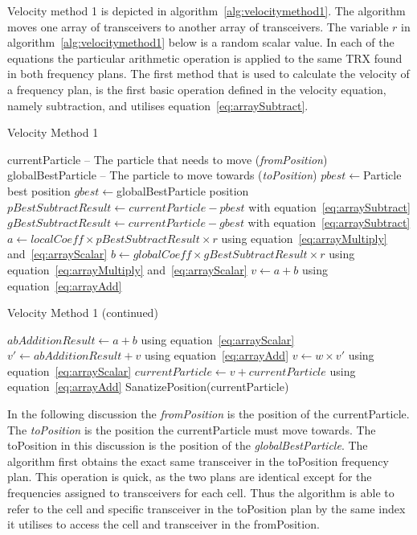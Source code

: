 Velocity method 1 is depicted in algorithm~\ref{alg:velocitymethod1}. The algorithm moves one array of transceivers to another array of transceivers. The variable $r$ in algorithm~\ref{alg:velocitymethod1} below is a random scalar value. In each of the equations the particular arithmetic operation is applied to the same TRX found in both frequency plans. The first method that is used to calculate the velocity of a frequency plan, is the first basic operation defined in the velocity equation, namely subtraction, and utilises equation~\ref{eq:arraySubtract}.
\begin{algorithm}[H]
\caption{Velocity Method 1}
\label{alg:velocitymethod1}
	\begin{algorithmic}[1]
        \Require currentParticle -- The particle that needs to move (\emph{fromPosition})
        \Require globalBestParticle -- The particle to move towards (\emph{toPosition})
	\State $pbest \leftarrow $Particle best position
	\State $gbest \leftarrow $globalBestParticle position
	\State $pBestSubtractResult \leftarrow currentParticle - pbest$ with equation~\ref{eq:arraySubtract}
	\State $gBestSubtractResult \leftarrow currentParticle - gbest$  with equation~\ref{eq:arraySubtract}
    \State $a \leftarrow localCoeff \times pBestSubtractResult \times r$ using equation~\ref{eq:arrayMultiply} and~\ref{eq:arrayScalar}
    \State $b \leftarrow globalCoeff \times gBestSubtractResult \times r$  using equation~\ref{eq:arrayMultiply} and~\ref{eq:arrayScalar}
		\State $v \leftarrow a + b$ using equation~\ref{eq:arrayAdd}
	\Else
    \end{algorithmic}
\addtocounter{algorithm}{-1}
\end{algorithm}

\begin{algorithm}
\caption{Velocity Method 1 (continued)}
\label{alg:velocitymethod1.1}
	\begin{algorithmic}[1]
		\State $abAdditionResult \leftarrow a + b$ using equation~\ref{eq:arrayScalar}
		\State $v' \leftarrow abAdditionResult + v$ using equation~\ref{eq:arrayAdd}
		\State $v \leftarrow w \times v'$ using equation~\ref{eq:arrayScalar}
	\EndIf
	\State $currentParticle \leftarrow v + currentParticle$ using equation~\ref{eq:arrayAdd}
	\State SanatizePosition(currentParticle)
	\end{algorithmic}
\end{algorithm}

In the following discussion the \emph{fromPosition} is the position of the currentParticle. The \emph{toPosition} is the position the currentParticle must move towards. The toPosition in this discussion is the position of the \emph{globalBestParticle}.
The algorithm first obtains the exact same transceiver in the toPosition frequency plan. This operation is quick, as the two plans are identical except for the frequencies assigned to transceivers for each cell. Thus the algorithm is able to refer to the cell and specific transceiver in the toPosition plan by the same index it utilises to access the cell and transceiver in the fromPosition.

